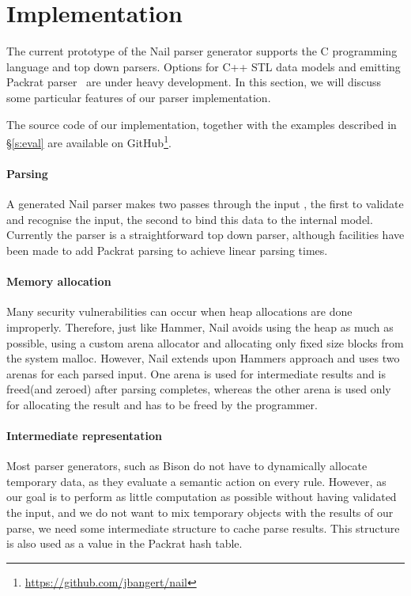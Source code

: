 \section{Implementation}
\label{s:impl}

The current prototype of the Nail parser generator supports the C programming
language and top down parsers. Options for C++ STL data models and emitting
Packrat parser~\cite{packrat-parsing:icfp02} are under heavy development. In
this section, we will discuss some particular features of our parser
implementation.

The source code of our implementation, together with the examples described in
\S\ref{s:eval} are available on GitHub\footnote{\url{https://github.com/jbangert/nail}}.
\paragraph{Parsing}
A generated Nail parser makes two passes through the input , the first to
validate and recognise the input, the second to bind this data to the internal
model. Currently the parser is a straightforward top down parser, although
facilities have been made to add Packrat parsing to achieve linear parsing
times.
\paragraph{Memory allocation}
Many security vulnerabilities can occur when heap allocations are done
improperly. Therefore, just like Hammer, Nail avoids using the heap as much as
possible, using a custom arena allocator and allocating only fixed size blocks
from the system malloc. However, Nail extends upon Hammers approach and uses two
arenas for each parsed input. One arena is used for intermediate results and is
freed(and zeroed) after parsing completes, whereas the other arena is used only
for allocating the result and has to be freed by the programmer.

\paragraph{Intermediate representation}
Most parser generators, such as Bison do not have to dynamically allocate
temporary data, as they evaluate a semantic action on every rule. However, as
our goal is to perform as little computation as possible without having
validated the input, and we do not want to mix temporary objects with the
results of our parse, we need some intermediate structure to cache parse
results. This structure is also used as a value in the Packrat hash table.

